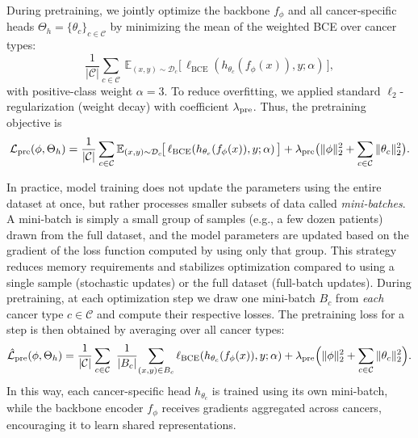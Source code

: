 \documentclass[diagnostics,article,submit,pdftex,moreauthors]{Definitions/mdpi}
\begin{document}
During pretraining, we jointly optimize the backbone $f_\phi$ and all cancer-specific heads $\Theta_h\!=\!\{\theta_c\}_{c\in\mathcal{C}}$ by minimizing the mean of the weighted BCE over cancer types:
\begin{equation}
  \frac{1}{|\mathcal{C}|}\sum_{c\in\mathcal{C}}
  \ \mathbb{E}_{(x,y)\sim\mathcal{D}_c}\!\big[\,\ell_{\mathrm{BCE}}(h_{\theta_c}(f_\phi(x)),y;\alpha)\,\big],
\end{equation}
with positive-class weight $\alpha{=}3$. 
To reduce overfitting, we applied standard $\ell_2$-regularization
(weight decay) with coefficient $\lambda_{\mathrm{pre}}$.
Thus, the pretraining objective is
\begin{equation}
  \label{eq:pre_obj}
  \mathcal{L}_{\mathrm{pre}}(\phi,\Theta_h)
  = \frac{1}{|\mathcal{C}|}\sum_{c\in\mathcal{C}}
  \mathbb{E}_{(x,y)\sim\mathcal{D}_c}\!\big[\,\ell_{\mathrm{BCE}}(h_{\theta_c}(f_\phi(x)),y;\alpha)\,\big]
  + \lambda_{\mathrm{pre}} \big( \|\phi\|_2^2 + \sum_{c\in\mathcal{C}} \|\theta_c\|_2^2 \big).
\end{equation}

In practice, model training does not update the parameters using the entire dataset at once, but rather processes smaller subsets of data called \emph{mini-batches}. 
A mini-batch is simply a small group of samples (e.g., a few dozen patients) drawn from the full dataset, and the model parameters are updated based on the gradient of the loss function computed by using only that group. 
This strategy reduces memory requirements and stabilizes optimization compared to using a single sample (stochastic updates) or the full dataset (full-batch updates).
During pretraining, at each optimization step we draw one mini-batch $B_c$ from \emph{each} cancer type $c\in\mathcal{C}$ and compute their respective losses. 
The pretraining loss for a step is then obtained by averaging over all cancer types:
\begin{equation}
  \label{eq:pre_mix}
  \hat{\mathcal{L}}_{\mathrm{pre}}(\phi,\Theta_h)
  =\frac{1}{|\mathcal{C}|}\sum_{c\in\mathcal{C}}\ \frac{1}{|B_c|}\!
  \sum_{(x,y)\in B_c}\ell_{\mathrm{BCE}}(h_{\theta_c}(f_\phi(x)),y;\alpha) 
  + \lambda_{\mathrm{pre}} \Big( \|\phi\|_2^2 + \sum_{c\in\mathcal{C}} \|\theta_c\|_2^2 \Big).
\end{equation}
In this way, each cancer-specific head $h_{\theta_c}$ is trained using its own mini-batch, while the backbone encoder $f_\phi$ receives gradients aggregated across cancers, encouraging it to learn shared representations.
\end{document}
